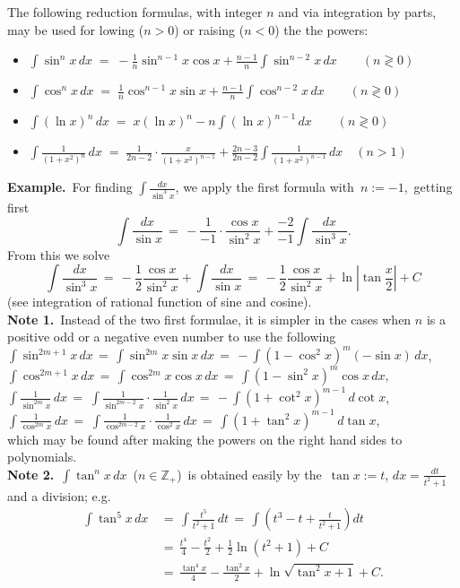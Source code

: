 \documentclass[12pt]{article}
\theoremstyle{definition}
\begin{document}
The following reduction formulas, with integer $n$ and  via integration by parts, may be used for lowing ($n > 0$) or raising ($n < 0$) the the powers:
\begin{itemize}
\item $\displaystyle \int\sin^nx\,dx 
\;=\; -\frac{1}{n}\sin^{n-1}x\cos{x}+\frac{n\!-\!1}{n}\int\sin^{n-2}x\,dx \qquad (n \gtrless 0)$
\item $\displaystyle \int\cos^nx\,dx 
\;=\; \frac{1}{n}\cos^{n-1}x\sin{x}+\frac{n\!-\!1}{n}\int\cos^{n-2}x\,dx \qquad (n \gtrless 0)$
\item $\displaystyle\int(\ln{x})^n\,dx \;=\; x(\ln{x})^n-n\int(\ln{x})^{n-1}\,dx \qquad (n \gtrless 0)$
\item $\displaystyle \int\frac{1}{(1+x^2)^n}\,dx 
\;=\; \frac{1}{2n\!-\!2}\cdot\frac{x}{(1\!+\!x^2)^{n-1}}+\frac{2n\!-\!3}{2n\!-\!2}\int\frac{1}{(1\!+\!x^2)^{n-1}}\,dx
      \quad (n > 1)$
\end{itemize}

\textbf{Example.}\, For finding $\displaystyle\int\!\frac{dx}{\sin^3x}$, we apply the first formula with\, $n := -1$,\, getting first
$$\int\!\frac{dx}{\sin{x}} \,=\, -\frac{1}{-1}\cdot\frac{\cos{x}}{\sin^2x}+\frac{-2}{-1}\int\frac{dx}{\sin^3x}.$$
From this we solve
$$\int\!\frac{dx}{\sin^3x} \,=\, -\frac{1}{2}\frac{\cos{x}}{\sin^2x}+\int\!\frac{dx}{\sin{x}} 
\,=\, -\frac{1}{2}\frac{\cos{x}}{\sin^2x}+\ln\left|\tan\frac{x}{2}\right|+C$$
(see integration of rational function of sine and cosine).\\

\textbf{Note 1.}\, Instead of the two first formulae, it is simpler in the cases when $n$ is a positive odd or a negative even number to use the following\\
$\displaystyle\int\sin^{2m+1}x\,dx \,=\, \int\sin^{2m}x\sin{x}\,dx \,=\, -\int(1-\cos^2x)^m(-\sin{x})\,dx$,\\
$\displaystyle\int\cos^{2m+1}x\,dx \,=\, \int\cos^{2m}x\cos{x}\,dx \,=\, \int(1-\sin^2x)^m\cos{x}\,dx,$\\
$\displaystyle\int\frac{1}{\sin^{2m}x}\,dx \,=\; \int\frac{1}{\sin^{2m-2}x}\cdot\frac{1}{\sin^2x}\,dx
\,=\, -\int(1+\cot^2x)^{m-1}\,d\cot{x}$,\\
$\displaystyle\int\frac{1}{\cos^{2m}x}\,dx \,=\; \int\frac{1}{\cos^{2m-2}x}\cdot\frac{1}{\cos^2x}\,dx
\,=\, \int(1+\tan^2x)^{m-1}\,d\tan{x}$,\\
which may be found after making the powers on the right hand sides to polynomials.\\

\textbf{Note 2.}\, $\int\tan^nx\,dx$\, ($n \in \mathbb{Z}_+$)\, is obtained easily by the  \,$\tan{x} := t$,\; $dx = \frac{dt}{t^2\!+\!1}$\,  and a division; e.g.
\begin{align*}
\int\tan^5x\,dx &\,=\, \int\frac{t^5}{t^2\!+\!1}\,dt \,=\, \int\!\left(t^3-t+\frac{t}{t^2\!+\!1}\right)dt\\
&\,=\, \frac{t^4}{4}-\frac{t^2}{2}+\frac{1}{2}\ln(t^2\!+\!1)+C \\
&\,=\, \frac{\tan^4x}{4}-\frac{\tan^2x}{2}+\ln\sqrt{\tan^2x+1}+C.
\end{align*}

\end{document}
